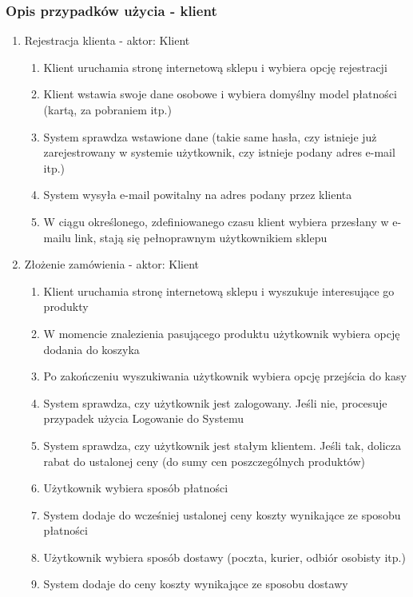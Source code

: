 \subsubsection{Opis przypadków użycia - klient}

\begin{enumerate}
  \item Rejestracja klienta - aktor: Klient
   \begin{enumerate}
    \item Klient uruchamia stronę internetową sklepu i wybiera opcję rejestracji
    \item Klient wstawia swoje dane osobowe i wybiera domyślny model płatności
    (kartą, za pobraniem itp.)
    \item System sprawdza wstawione dane (takie same hasła, czy istnieje już
    zarejestrowany w systemie użytkownik, czy istnieje podany adres e-mail itp.)
    \item System wysyła e-mail powitalny na adres podany przez klienta
    \item W ciągu określonego, zdefiniowanego czasu klient wybiera przesłany w
    e-mailu link, stają się pełnoprawnym użytkownikiem sklepu
  \end{enumerate}
  \item Złożenie zamówienia - aktor: Klient
  \begin{enumerate}
    \item Klient uruchamia stronę internetową sklepu i wyszukuje interesujące go
    produkty
    \item W momencie znalezienia pasującego produktu użytkownik wybiera opcję
    dodania do koszyka
    \item Po zakończeniu wyszukiwania użytkownik wybiera opcję przejścia do kasy
    \item System sprawdza, czy użytkownik jest zalogowany. Jeśli nie, procesuje
    przypadek użycia Logowanie do Systemu
    \item System sprawdza, czy użytkownik jest stałym klientem. Jeśli tak,
    dolicza rabat do ustalonej ceny (do sumy cen poszczególnych produktów)
    \item Użytkownik wybiera sposób płatności
    \item System dodaje do wcześniej ustalonej ceny koszty wynikające ze sposobu
    płatności
    \item Użytkownik wybiera sposób dostawy (poczta, kurier, odbiór osobisty
    itp.)
    \item System dodaje do ceny koszty wynikające ze sposobu dostawy

\end{enumerate}
\end{enumerate}
